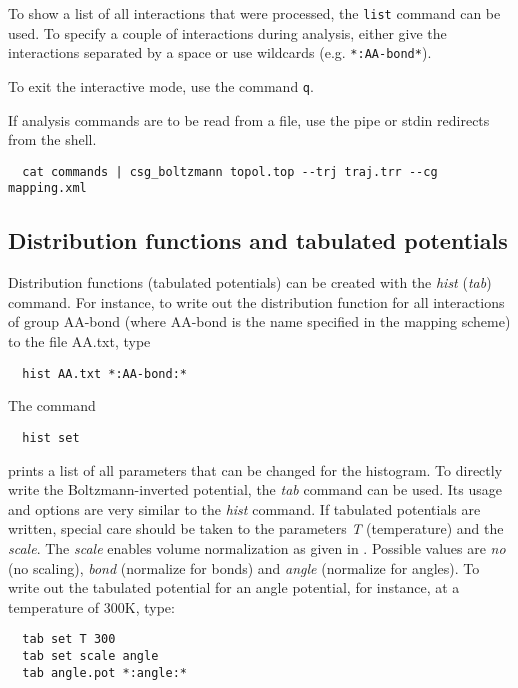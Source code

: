 To show a list of all interactions that were processed, the \texttt{list} command can be used. To specify a couple of interactions during analysis, either give the interactions separated by a space or use wildcards (e.g. \texttt{*:AA-bond*}).

To exit the interactive mode, use the command \texttt{q}. 

If analysis commands are to be read from a file, use the pipe or stdin redirects from the shell.
\begin{verbatim}
  cat commands | csg_boltzmann topol.top --trj traj.trr --cg mapping.xml
\end{verbatim}

\subsection{Distribution functions and tabulated potentials}
Distribution functions (tabulated potentials) can be created with the \textit{hist} (\textit{tab}) command.
For instance, to write out the distribution function for all interactions of group AA-bond (where AA-bond is the name specified in the mapping scheme) to the file AA.txt, type
\begin{verbatim}
  hist AA.txt *:AA-bond:*
\end{verbatim}
The command
\begin{verbatim}
  hist set
\end{verbatim}
prints a list of all parameters that can be changed for the histogram. To directly write the Boltzmann-inverted potential, the \textit{tab} command can be used. Its usage and options are very similar to the \textit{hist} command. If tabulated potentials are written, special care should be taken to the parameters \textit{T} (temperature) and the \textit{scale}. The \textit{scale} enables volume normalization as given in . Possible values are \textit{no} (no scaling), \textit{bond} (normalize for bonds) and \textit{angle} (normalize for angles). To write out the tabulated potential for an angle potential, for instance, at a temperature of 300K, type:
\begin{verbatim}
  tab set T 300
  tab set scale angle
  tab angle.pot *:angle:*
\end{verbatim}

